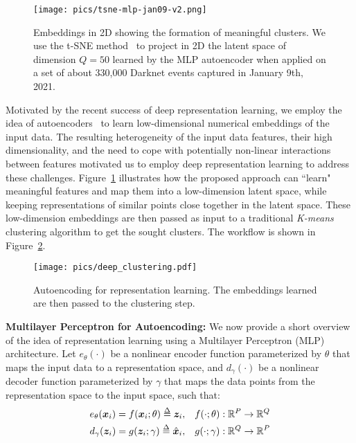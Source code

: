 \documentclass[manuscript, nonacm]{acmart}
\def\delequal{\mathrel{\ensurestackMath{\stackon[1pt]{=}{\scriptstyle\Delta}}}}
\newcommand{\para}[1]{\vspace*{1ex}\noindent\textbf{#1} }
\newcommand{\bx}{\bm{x}}%
\newcommand{\bz}{\bm{z}}%
\newcommand{\etheta}{e_{\theta}}
\newcommand{\dgamma}{d_{\gamma}}
\begin{document}
\begin{figure}[th]
    \centering
    \texttt{[image: pics/tsne-mlp-jan09-v2.png]}
    \caption{Embeddings in 2D showing the formation of meaningful clusters. 
    We use the t-SNE method~\cite{JMLR:v9:vandermaaten08a}
    to project in 2D the latent space of dimension $Q=50$ learned by the MLP autoencoder when applied on a set of about 330,000
    Darknet events captured in January 9th, 2021.}
    \label{fig:tsne}
\end{figure}


Motivated by the recent success of deep representation learning,
we employ the idea of autoencoders~\cite{pmlr-v70-yang17b, 10.1145/3278532.3278545, 2013arXiv1312.6114K}
to learn low-dimensional numerical embeddings of the input data. 
The resulting heterogeneity of the input data features, their high dimensionality, 
and the need to cope with potentially non-linear 
interactions between features motivated us to employ deep
representation learning to address these challenges. 
Figure~\ref{fig:tsne} illustrates how the proposed approach can
``learn" meaningful features and map them into a low-dimension latent space,
while keeping representations of similar points close together in the latent space.
These low-dimension embeddings are then passed as input to
a traditional \emph{K-means} clustering algorithm
to get the sought clusters.
The workflow is shown in Figure~\ref{fig:deep_cluster_workflow}. 

\begin{figure}[t]
    \centering
    \texttt{[image: pics/deep\_clustering.pdf]}
    \caption{Autoencoding for representation learning. The embeddings
    learned are then passed to the clustering step.}
    \label{fig:deep_cluster_workflow}
\end{figure}

\para{Multilayer Perceptron for Autoencoding:} 
We now provide a short overview of the idea of representation learning using a Multilayer Perceptron (MLP)
architecture. 
Let $\etheta(\cdot)$ be a nonlinear encoder function parameterized by $\theta$ that maps the input data 
to a representation space, and $\dgamma(\cdot)$ be a nonlinear decoder function parameterized by $\gamma$ that maps
the data points from the representation space to the input space, such that:
\begin{align}
    &\etheta(\bx_i)=f(\bx_i;\theta)\delequal \bz_i, & f(\cdot;\theta): \mathbb{R}^P \rightarrow \mathbb{R}^Q \nonumber\\
    &\dgamma(\bz_i)=g(\bz_i;\gamma)\delequal \hat{\bx}_i, & g(\cdot;\gamma): \mathbb{R}^Q \rightarrow \mathbb{R}^P \nonumber
\end{align}
\end{document}
